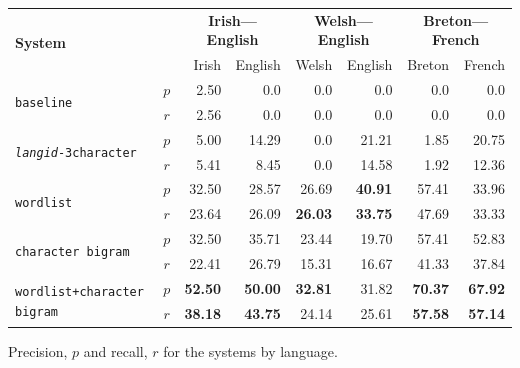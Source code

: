 \documentclass[a0paper,fontscale=0.3]{baposter}  %
\begin{document}
\begin{poster}
{			\begin{center}
			\begin{tabular}{|lc|r|r|r|r|r|r|}
			\hline
			\multirow{2}{*}{\textbf{System}}            & & \multicolumn{2}{c}{\textbf{Irish---English}} & \multicolumn{2}{|c|}{\textbf{Welsh---English}} & \multicolumn{2}{c|}{\textbf{Breton---French}}  \\\cline{3-8}
			                                          &      &  Irish &  English & Welsh  & English & Breton & French \\
			\hline
			\multirow{2}{*}{\texttt{baseline}}        &  $p$ &  2.50   & 0.0      & 0.0   & 0.0 & 0.0 & 0.0 \\
			                                          & $r$  & 2.56    & 0.0      & 0.0   & 0.0 & 0.0 & 0.0 \\
			\hline
			\multirow{2}{*}{\texttt{\emph{langid}-3character}}         &  $p$ &  5.00   & 14.29    & 0.0   & 21.21 & 1.85 & 20.75 \\
			                                          & $r$  & 5.41    & 8.45     & 0.0   & 14.58 & 1.92 & 12.36 \\
			\hline
			\multirow{2}{*}{\texttt{wordlist}}        &  $p$ &  32.50 & 28.57     & 26.69 & {\bf 40.91} & 57.41 & 33.96 \\
			                                          & $r$  & 23.64  & 26.09     & {\bf 26.03} & {\bf 33.75} & 47.69 & 33.33 \\
			\hline
			\multirow{2}{*}{\texttt{character bigram}}          &  $p$ &  32.50   & 35.71   & 23.44 & 19.70  & 57.41 & 52.83 \\
			                                          & $r$  & 22.41    & 26.79   & 15.31 & 16.67 & 41.33 & 37.84 \\
			\hline
			\multirow{2}{*}{\texttt{wordlist+character bigram}} &  $p$ &  {\bf 52.50}   & {\bf 50.00}   & {\bf 32.81} & 31.82 & {\bf 70.37} & {\bf 67.92} \\
			                                          & $r$  & {\bf 38.18}    & {\bf 43.75}   & 24.14 & 25.61 & {\bf 57.58} & {\bf 57.14} \\
			\hline
			\end{tabular}
			\end{center}
			\vspace{-0.4cm}
		\caption{Precision, $p$ and recall, $r$ for the systems by language.}
			\label{table:precisionrecall}
			
			\vspace{0.18cm}

}
\end{poster}
\end{document}
